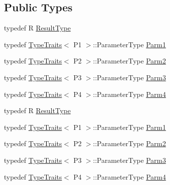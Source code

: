 \subsection*{Public Types}
\begin{DoxyCompactItemize}
\item 
typedef R \mbox{\hyperlink{classUtil_1_1FunctorImpl_3_01R_00_01TYPELIST__4_07P1_00_01P2_00_01P3_00_01P4_08_4_a9218a4b4370d688d3e144a75e5d24cfe}{Result\+Type}}
\item 
typedef \mbox{\hyperlink{classUtil_1_1TypeTraits}{Type\+Traits}}$<$ P1 $>$\+::Parameter\+Type \mbox{\hyperlink{classUtil_1_1FunctorImpl_3_01R_00_01TYPELIST__4_07P1_00_01P2_00_01P3_00_01P4_08_4_ab22bf7d6b59a883bb4a582f3a8ceaccc}{Parm1}}
\item 
typedef \mbox{\hyperlink{classUtil_1_1TypeTraits}{Type\+Traits}}$<$ P2 $>$\+::Parameter\+Type \mbox{\hyperlink{classUtil_1_1FunctorImpl_3_01R_00_01TYPELIST__4_07P1_00_01P2_00_01P3_00_01P4_08_4_aaf289567dfbd9f3379db79d06f02f4a7}{Parm2}}
\item 
typedef \mbox{\hyperlink{classUtil_1_1TypeTraits}{Type\+Traits}}$<$ P3 $>$\+::Parameter\+Type \mbox{\hyperlink{classUtil_1_1FunctorImpl_3_01R_00_01TYPELIST__4_07P1_00_01P2_00_01P3_00_01P4_08_4_a50b605c92c54da7770a000867a97287a}{Parm3}}
\item 
typedef \mbox{\hyperlink{classUtil_1_1TypeTraits}{Type\+Traits}}$<$ P4 $>$\+::Parameter\+Type \mbox{\hyperlink{classUtil_1_1FunctorImpl_3_01R_00_01TYPELIST__4_07P1_00_01P2_00_01P3_00_01P4_08_4_a7375a2710126cb146191bd1c17af2f1d}{Parm4}}
\item 
typedef R \mbox{\hyperlink{classUtil_1_1FunctorImpl_3_01R_00_01TYPELIST__4_07P1_00_01P2_00_01P3_00_01P4_08_4_a9218a4b4370d688d3e144a75e5d24cfe}{Result\+Type}}
\item 
typedef \mbox{\hyperlink{classUtil_1_1TypeTraits}{Type\+Traits}}$<$ P1 $>$\+::Parameter\+Type \mbox{\hyperlink{classUtil_1_1FunctorImpl_3_01R_00_01TYPELIST__4_07P1_00_01P2_00_01P3_00_01P4_08_4_ab22bf7d6b59a883bb4a582f3a8ceaccc}{Parm1}}
\item 
typedef \mbox{\hyperlink{classUtil_1_1TypeTraits}{Type\+Traits}}$<$ P2 $>$\+::Parameter\+Type \mbox{\hyperlink{classUtil_1_1FunctorImpl_3_01R_00_01TYPELIST__4_07P1_00_01P2_00_01P3_00_01P4_08_4_aaf289567dfbd9f3379db79d06f02f4a7}{Parm2}}
\item 
typedef \mbox{\hyperlink{classUtil_1_1TypeTraits}{Type\+Traits}}$<$ P3 $>$\+::Parameter\+Type \mbox{\hyperlink{classUtil_1_1FunctorImpl_3_01R_00_01TYPELIST__4_07P1_00_01P2_00_01P3_00_01P4_08_4_a50b605c92c54da7770a000867a97287a}{Parm3}}
\item 
typedef \mbox{\hyperlink{classUtil_1_1TypeTraits}{Type\+Traits}}$<$ P4 $>$\+::Parameter\+Type \mbox{\hyperlink{classUtil_1_1FunctorImpl_3_01R_00_01TYPELIST__4_07P1_00_01P2_00_01P3_00_01P4_08_4_a7375a2710126cb146191bd1c17af2f1d}{Parm4}}
\end{DoxyCompactItemize}

